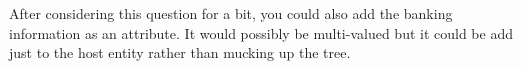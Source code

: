 \documentclass[11pt]{article}
\begin{document}
\begin{enumerate}
After considering this question for a bit, you could also add the banking information as an attribute.  It would possibly be multi-valued but it could be add just to the host entity rather than mucking up the tree.



\end{enumerate}
\end{document}

